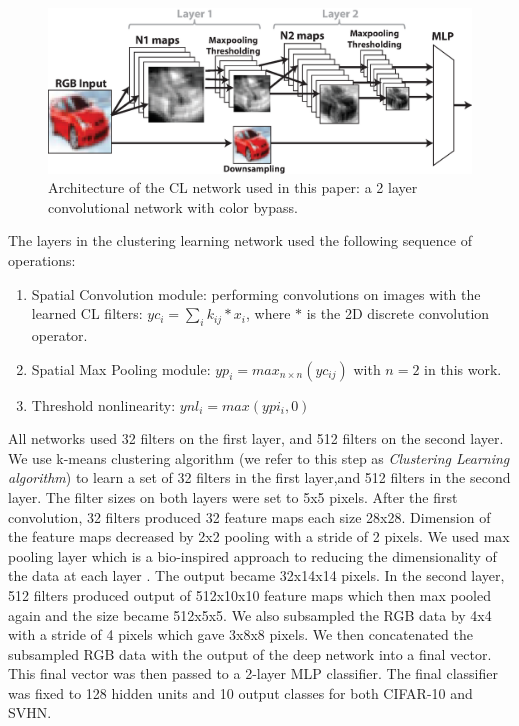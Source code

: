 \documentclass{article} %
\begin{document}
\begin{figure}
\includegraphics[width=5in]{overall-structure.eps}
\caption{Architecture of the CL network used in this paper: a 2 layer convolutional network with color bypass.}
\label{fig-netarch}
\end{figure}


The layers in the clustering learning network used the following sequence of operations:
\begin{enumerate}
\item Spatial Convolution module: performing convolutions on images with the learned CL filters: $yc_i=\sum_i{k_{ij}\ast x_i}$,
where $\ast$ is the 2D discrete convolution operator.
\item Spatial Max Pooling module: $yp_i = max_{n \times n}(yc_{ij})$ with $n =  2$ in this work.
\item Threshold nonlinearity: $ynl_i = max(ypi_i, 0)$
\end{enumerate}

All networks used 32 filters on the first layer, and 512 filters on the second layer.
We use k-means clustering algorithm (we refer to this step as \textit{Clustering Learning algorithm})
to learn a set of 32 filters in the first layer,and 512 filters in the second layer.
The filter sizes on both layers were set to 5x5 pixels.
After the first convolution, 32 filters produced 32 feature maps each size 28x28.
Dimension of the feature maps decreased by 2x2 pooling with a stride of 2 pixels.
We used max pooling layer which is a bio-inspired approach to reducing the dimensionality of the data at each layer \cite{lampl2004intracellular}.
The output became 32x14x14 pixels.
In the second layer, 512 filters produced output of 512x10x10 feature maps which then max pooled again and the size became 512x5x5. 
We also subsampled the RGB data by 4x4 with a stride of 4 pixels which gave 3x8x8 pixels.
We then concatenated the subsampled RGB data with the output of the deep network into a final vector.
This final vector was then passed to a 2-layer MLP classifier.
The final classifier was fixed to 128 hidden units and 10 output classes for both CIFAR-10 and SVHN.
\end{document}
